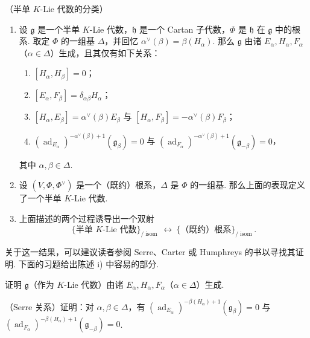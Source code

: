 \begin{theorem}\label{thm:lie-2-6-5}
（半单 $K$-Lie 代数的分类）
\begin{enumerate}[label=\roman*)]
\item 设 $\mathfrak g$ 是一个半单 $K$-Lie 代数，$\mathfrak h$ 是一个 Cartan 子代数，$\Phi$ 是 $\mathfrak h$ 在 $\mathfrak g$ 中的根系. 取定 $\Phi$ 的一组基 $\Delta$，并回忆 $\alpha^{\vee}(\beta)=\beta(H_{\alpha})$. 那么 $\mathfrak g$ 由诸 $E_{\alpha},H_{\alpha},F_{\alpha}$（$\alpha\in\Delta$）生成，且其仅有如下关系：
\begin{enumerate}[label=(\alph*)]
\item $[H_{\alpha},H_{\beta}]=0$；
\item $[E_{\alpha},F_{\beta}]=\delta_{\alpha\beta}H_{\alpha}$；
\item $[H_{\alpha},E_{\beta}]=\alpha^{\vee}(\beta)E_{\beta}$ 与 $[H_{\alpha},F_{\beta}]=-\alpha^{\vee}(\beta)F_{\beta}$；
\item $(\operatorname{ad}_{E_{\alpha}})^{-\alpha^{\vee}(\beta)+1}(\mathfrak g_{\beta})=0$ 与 $(\operatorname{ad}_{F_{\alpha}})^{-\alpha^{\vee}(\beta)+1}(\mathfrak g_{-\beta})=0$，
\end{enumerate}
其中 $\alpha,\beta\in\Delta$.
\item 设 $(V,\Phi,\Phi^{\vee})$ 是一个（既约）根系，$\Delta$ 是 $\Phi$ 的一组基. 那么上面的表现定义了一个半单 $K$-Lie 代数.
\item 上面描述的两个过程诱导出一个双射
\[
\{\text{半单 $K$-Lie 代数}\}_{/\operatorname{isom}}
\ \longleftrightarrow\
\{\text{（既约）根系}\}_{/\operatorname{isom}}.
\]
\end{enumerate}
\end{theorem}

关于这一结果，可以建议读者参阅 Serre、Carter 或 Humphreys 的书以寻找其证明. 下面的习题给出陈述 i) 中容易的部分.

\begin{exercise*}
证明 $\mathfrak g$（作为 $K$-Lie 代数）由诸 $E_{\alpha},H_{\alpha},F_{\alpha}$（$\alpha\in\Delta$）生成.
\end{exercise*}

\begin{exercise*}
（Serre 关系）证明：对 $\alpha,\beta\in\Delta$，有 $(\operatorname{ad}_{E_{\alpha}})^{-\beta(H_{\alpha})+1}(\mathfrak g_{\beta})=0$ 与 $(\operatorname{ad}_{F_{\alpha}})^{-\beta(H_{\alpha})+1}(\mathfrak g_{-\beta})=0$.
\end{exercise*}

